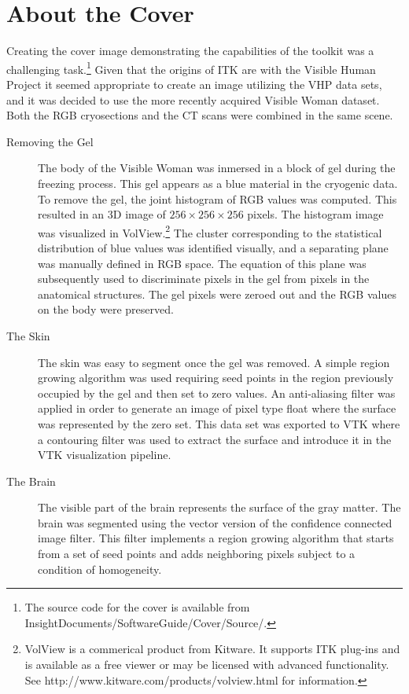 \small

\chapter*{About the Cover}

Creating the cover image demonstrating the capabilities of the toolkit was a
challenging task.\footnote{The source code for the cover is available from
InsightDocuments/SoftwareGuide/Cover/Source/.} Given that the origins of ITK
are with the Visible Human Project it seemed appropriate to create an image
utilizing the VHP data sets, and it was decided to use the more recently
acquired Visible Woman dataset.  Both the RGB cryosections and the CT scans
were combined in the same scene.

\begin{description}

\item [Removing the Gel]
The body of the Visible Woman was inmersed in a block of gel during the
freezing process. This gel appears as a blue material in the cryogenic data.
To remove the gel, the joint histogram of RGB values was computed. This
resulted in an 3D image of $256\times256\times256$ pixels. The histogram
image was visualized in VolView.\footnote{VolView is a commerical product
from Kitware. It supports ITK plug-ins and is available as a free viewer or
may be licensed with advanced functionality. See
http://www.kitware.com/products/volview.html for information.} The cluster
corresponding to the statistical distribution of blue values was identified
visually, and a separating plane was manually defined in RGB space. The
equation of this plane was subsequently used to discriminate pixels in the
gel from pixels in the anatomical structures. The gel pixels were zeroed out
and the RGB values on the body were preserved.

\item[The Skin]
The skin was easy to segment once the gel was removed. A simple region
growing algorithm was used requiring seed points in the region previously
occupied by the gel and then set to zero values. An anti-aliasing filter was
applied in order to generate an image of pixel type float where the surface
was represented by the zero set. This data set was exported to VTK where a
contouring filter was used to extract the surface and introduce it in the VTK
visualization pipeline.

\item[The Brain]
The visible part of the brain represents the surface of the gray matter.  The
brain was segmented using the vector version of the confidence connected
image filter.  This filter implements a region growing algorithm that starts
from a set of seed points and adds neighboring pixels subject to a condition
of homogeneity.


\end{description}
